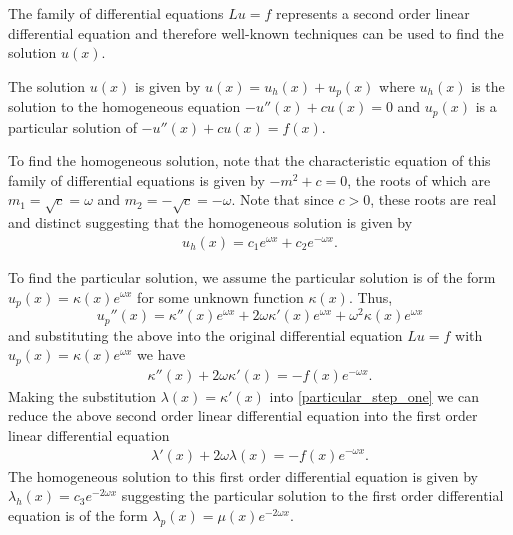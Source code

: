 The family of differential equations $Lu = f$ represents a second order linear
differential equation and therefore well-known techniques can be used to find
the solution $u(x)$.

The solution $u(x)$ is given by $u(x) = u_h(x) + u_p(x)$ where $u_h(x)$ is
the solution to the homogeneous equation $-u''(x) + c u(x) = 0$ and $u_p(x)$
is a particular solution of $-u''(x) + c u(x) = f(x)$.

To find the homogeneous solution, note that the characteristic equation of
this family of differential equations is given by $-m^2 + c = 0$, the roots of
which are $m_1 = \sqrt{c} = \omega $ and $m_2 = -\sqrt{c} = -\omega$. Note
that since $c > 0$, these roots are real and distinct suggesting that the
homogeneous solution is given by
\begin{align}\label{homogeneous_solution}
  u_h(x) = c_1 e^{\omega x} + c_2 e^{-\omega x}.
\end{align}

To find the particular solution, we assume the particular solution is of the
form $u_p(x) = \kappa(x) e^{\omega x}$ for some unknown function $\kappa(x)$.
Thus,
\[
u_p''(x) = \kappa''(x) e^{\omega x} + 2 \omega \kappa'(x) e^{\omega x} + \omega^2 \kappa(x) e^{\omega x}
\]
and substituting the above into the original differential equation $Lu = f$
with $u_p(x) = \kappa(x) e^{\omega x}$ we have
\begin{align}\label{particular_step_one}
  \kappa''(x) + 2\omega\kappa'(x) = -f(x)e^{-\omega x}.
\end{align}
Making the substitution $\lambda(x) = \kappa'(x)$ into \eqref{particular_step_one}
we can reduce the above second order linear differential equation into the
first order linear differential equation
\begin{align}\label{particular_step_two}
  \lambda'(x) + 2\omega\lambda(x) = -f(x)e^{-\omega x}.
\end{align}
The homogeneous solution to this first order differential equation is given by
$\lambda_h(x) = c_3 e^{-2\omega x}$ suggesting the particular solution to the
first order differential equation is of the form $\lambda_p(x) = \mu(x) e^{-2\omega x}$.

